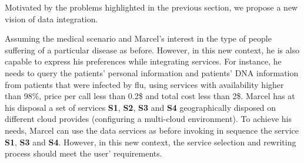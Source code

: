 Motivated by the problems highlighted in the previous section, we propose a new vision of data integration.


Assuming the medical scenario and Marcel's interest in the type of people suffering of a particular disease as before. However, in this new context, he is also capable to express his preferences while integrating services. For instance, he needs to query the patients' personal information and patients' DNA information from patients that were infected by flu, using services with availability higher than 98\%, price per call less than 0.2\$ and total cost less than 2\$. 
Marcel has at his disposal a set of services \textbf{S1}, \textbf{S2}, \textbf{S3} and \textbf{S4} geographically disposed on different cloud provides (configuring a multi-cloud environment).
To achieve his needs, Marcel can use the data services as before invoking in sequence the service \textbf{S1}, \textbf{S3} and \textbf{S4}. However, in this new context, the service selection and rewriting process should meet the user' requirements.   



